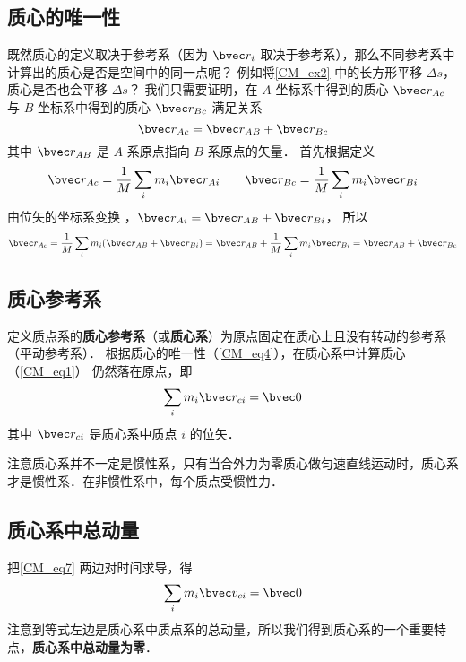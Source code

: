 \subsection{质心的唯一性}
既然质心的定义取决于参考系（因为 $\bvec r_i$ 取决于参考系），那么不同参考系中计算出的质心是否是空间中的同一点呢？ 例如将\autoref{CM_ex2} 中的长方形平移 $\Delta s$， 质心是否也会平移 $\Delta s$？ 我们只需要证明，在 $A$ 坐标系中得到的质心 $\bvec r_{Ac}$ 与 $B$ 坐标系中得到的质心 $\bvec r_{Bc}$ 满足关系
\begin{equation}\label{CM_eq4}
\bvec r_{Ac} = \bvec r_{AB} + \bvec r_{Bc}
\end{equation}
其中 $\bvec r_{AB}$ 是 $A$ 系原点指向 $B$ 系原点的矢量． 首先根据定义
\begin{equation}
\bvec r_{Ac} = \frac{1}{M}\sum_i m_i \bvec r_{Ai}  \qquad \bvec r_{Bc} = \frac{1}{M}\sum_i  m_i \bvec r_{Bi} 
\end{equation}
由位矢的坐标系变换%
，$\bvec r_{Ai} = \bvec r_{AB} + \bvec r_{Bi}$， 所以
\begin{equation}
\bvec r_{Ac} = \frac{1}{M}\sum_i m_i(\bvec r_{AB} + \bvec r_{Bi})  = \bvec r_{AB} + \frac{1}{M} \sum_i m_i \bvec r_{Bi}  = \bvec r_{AB} + \bvec r_{Bc}
\end{equation}

\subsection{质心参考系}
定义质点系的\textbf{质心参考系}（或\textbf{质心系}）为原点固定在质心上且没有转动的参考系（平动参考系）．%
根据质心的唯一性（\autoref{CM_eq4}），在质心系中计算质心（\autoref{CM_eq1}） 仍然落在原点，即
\begin{equation}\label{CM_eq7}
\sum_i m_i \bvec r_{ci} = \bvec 0
\end{equation}
其中 $\bvec r_{ci}$ 是质心系中质点 $i$ 的位矢．

注意质心系并不一定是惯性系，只有当合外力为零质心做匀速直线运动时，质心系才是惯性系．在非惯性系中，每个质点受惯性力．

\subsection{质心系中总动量}
把\autoref{CM_eq7} 两边对时间求导，得
\begin{equation}\label{CM_eq8}
\sum_i m_i \bvec v_{ci} = \bvec 0
\end{equation}
注意到等式左边是质心系中质点系的总动量，所以我们得到质心系的一个重要特点，\textbf{质心系中总动量为零}．
